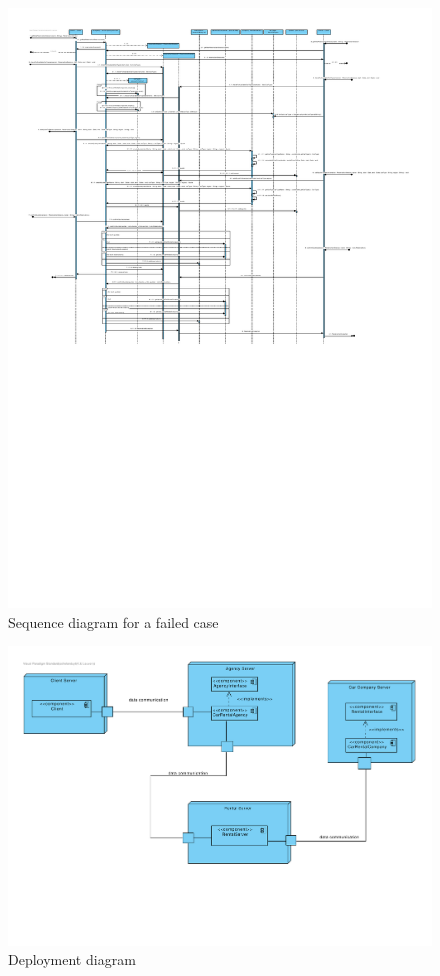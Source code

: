 \documentclass{ds-report}
\begin{document}
	\begin{figure}[t]
		\centering
		\caption{Sequence diagram for a failed case}
	\includegraphics[scale=0.9]{failedSequenceDiagram}
	\end{figure}
	
	\begin{figure}[t]
	\centering
		\caption{Deployment diagram}
	\includegraphics[scale=0.5]{deploymentDiagram}

	\end{figure}	
	
	\clearpage

	
	
\end{document}
